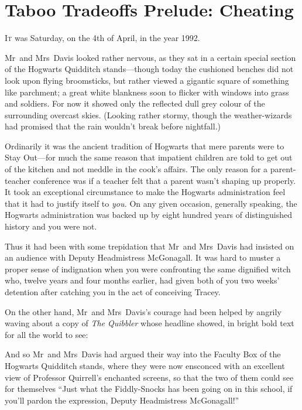 \chapter{Taboo Tradeoffs Prelude: Cheating}

\lettrine{I}{t} was Saturday,
on the 4th of April, in the year 1992.

\quad\quad
Mr~and Mrs~Davis looked rather nervous, as they sat in a certain special section of the Hogwarts Quidditch stands—though today the cushioned benches did not look upon flying broomsticks, but rather viewed a gigantic square of something like parchment; a great white blankness soon to flicker with windows into grass and soldiers. For now it showed only the reflected dull grey colour of the surrounding overcast skies. (Looking rather stormy, though the weather-wizards had promised that the rain wouldn’t break before nightfall.)

Ordinarily it was the ancient tradition of Hogwarts that mere parents were to Stay Out—for much the same reason that impatient children are told to get out of the kitchen and not meddle in the cook’s affairs. The only reason for a parent-teacher conference was if a teacher felt that a parent wasn’t shaping up properly. It took an exceptional circumstance to make the Hogwarts administration feel that it had to justify itself to \emph{you.} On any given occasion, generally speaking, the Hogwarts administration was backed up by eight hundred years of distinguished history and you were not.

Thus it had been with some trepidation that Mr~and Mrs~Davis had insisted on an audience with Deputy Headmistress McGonagall. It was hard to muster a proper sense of indignation when you were confronting the same dignified witch who, twelve years and four months earlier, had given both of you two weeks’ detention after catching you in the act of conceiving Tracey.

On the other hand, Mr~and Mrs~Davis’s courage had been helped by angrily waving about a copy of \emph{The Quibbler} whose headline showed, in bright bold text for all the world to see:


And so Mr~and Mrs~Davis had argued their way into the Faculty Box of the Hogwarts Quidditch stands, where they were now ensconced with an excellent view of Professor Quirrell’s enchanted screens, so that the two of them could see for themselves “Just what the Fiddly-Snocks has been going on in this school, if you’ll pardon the expression, Deputy Headmistress McGonagall!”

